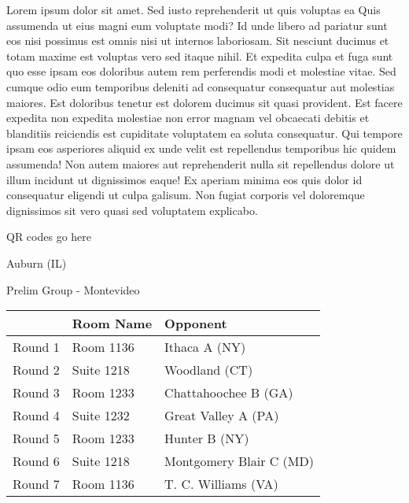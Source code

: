 \documentclass{article}%
\begin{document}
\vspace*{8pt}%
\linebreak%
\newline%
\newline%
Lorem ipsum dolor sit amet. Sed iusto reprehenderit ut quis voluptas ea Quis assumenda ut eius magni eum voluptate modi? Id unde libero ad pariatur sunt eos nisi possimus est omnis nisi ut internos laboriosam. Sit nesciunt ducimus et totam maxime est voluptas vero sed itaque nihil. Et expedita culpa et fuga sunt quo esse ipsam eos doloribus autem rem perferendis modi et molestiae vitae.\newline%
\newline%
Sed cumque odio eum temporibus deleniti ad consequatur consequatur aut molestias maiores. Est doloribus tenetur est dolorem ducimus sit quasi provident. Est facere expedita non expedita molestiae non error magnam vel obcaecati debitis et blanditiis reiciendis est cupiditate voluptatem ea soluta consequatur. Qui tempore ipsam eos asperiores aliquid ex unde velit est repellendus temporibus hic quidem assumenda!\newline%
\newline%
Non autem maiores aut reprehenderit nulla sit repellendus dolore ut illum incidunt ut dignissimos eaque! Ex aperiam minima eos quis dolor id consequatur eligendi ut culpa galisum. Non fugiat corporis vel doloremque dignissimos sit vero quasi sed voluptatem explicabo.\newline%
\newline%
%
\vspace*{30pt}%
\begin{center}%
\begin{Huge}%
QR codes go here%
\end{Huge}%
\end{center}%
\newpage%
%
\begin{center}%
\begin{Huge}%
Auburn (IL)%
\end{Huge}%
\vspace*{8pt}%
\linebreak%
\begin{Large}%
Prelim Group {-} Montevideo%
\end{Large}%
\end{center}%
\begin{tabularx}{\textwidth}{|c|Y|Y|}%
\hline%
&Room Name&Opponent\\%
\hline%
Round 1&Room 1136&Ithaca A (NY)\\%
Round 2&Suite 1218&Woodland (CT)\\%
Round 3&Room 1233&Chattahoochee B (GA)\\%
Round 4&Suite 1232&Great Valley A (PA)\\%
Round 5&Room 1233&Hunter B (NY)\\%
Round 6&Suite 1218&Montgomery Blair C (MD)\\%
Round 7&Room 1136&T. C. Williams (VA)\\%
\hline%
\end{tabularx}%
\end{document}
